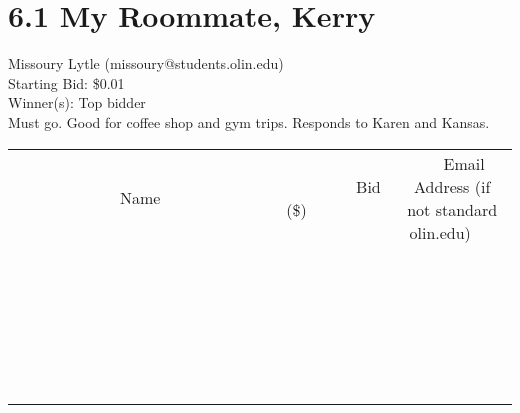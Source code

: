 \documentclass[11pt]{article}
\begin{document}
\section*{6.1 My Roommate, Kerry}
Missoury Lytle (missoury@students.olin.edu) \\
Starting Bid: \$0.01 \\
Winner(s): 
Top bidder \\
Must go. Good for coffee shop and gym trips. Responds to Karen and Kansas. \\[6ex]
\begin{tabular}{c c c}
~~~~~~~~~~~~~Name~~~~~~~~~~~~~ & ~~~~~~~~~Bid (\$)~~~~~~~~~ & ~~~Email Address (if not standard olin.edu)~~~ \\
 & & \\
\hline
 & & \\
\hline
 & & \\
\hline
 & & \\
\hline
 & & \\
\hline
 & & \\
\hline
 & & \\
\hline
 & & \\
\hline
 & & \\
\hline
 & & \\
\hline
 & & \\
\hline
 & & \\
\hline
 & & \\
\hline
 & & \\
\hline
 & & \\
\hline
 & & \\
\hline
 & & \\
\hline
 & & \\
\hline
 & & \\
\hline
 & & \\
\hline
 & & \\
\hline
 & & \\
\hline
 & & \\
\hline
 & & \\
\hline
 & & \\
\hline
 & & \\
\hline
\end{tabular}
\clearpage
\end{document}
